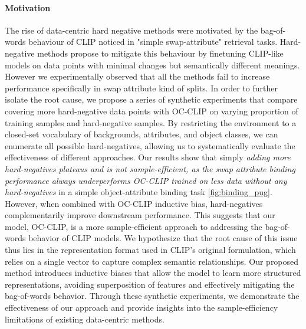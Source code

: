 \paragraph{Motivation}The rise of data-centric hard negative methods were motivated by the bag-of-words behaviour \citep{yuksekgonul2023when} of CLIP noticed in "simple swap-attribute" retrieval tasks. Hard-negative methods propose to mitigate this behaviour by finetuning CLIP-like models  on data points with minimal changes but semantically different meanings. However we experimentally observed that all the methods fail to increase performance specifically in swap attribute kind of splits. In order to further isolate the root cause, we propose a series of synthetic experiments that compare covering more hard-negative data points with OC-CLIP on varying proportion of training samples and hard-negative samples. By restricting the environment to a closed-set vocabulary of backgrounds, attributes, and object classes, we can enumerate all possible hard-negatives, allowing us to systematically evaluate the effectiveness of different approaches.
Our results show that simply \emph{adding more hard-negatives plateaus and is not sample-efficient, as the swap attribute binding performance always underperforms OC-CLIP trained on less data without any hard-negatives} in a simple object-attribute binding task \ref{fig:binding_pug}. However, when combined with OC-CLIP inductive bias, hard-negatives complementarily improve downstream performance. This suggests that our model, OC-CLIP, is a more sample-efficient approach to addressing the bag-of-words behavior of CLIP models.
We hypothesize that the root cause of this issue thus lies in the representation format used in CLIP's original formulation, which relies on a single vector to capture complex semantic relationships. Our proposed method introduces inductive biases that allow the model to learn more structured representations, avoiding superposition of features \citep{greff2020bindingproblemartificialneural} and effectively mitigating the bag-of-words behavior. Through these synthetic experiments, we demonstrate the effectiveness of our approach and provide insights into the sample-efficiency limitations of existing data-centric methods.

